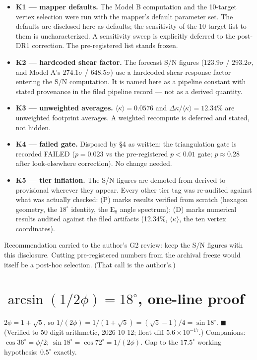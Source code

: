 \documentclass{alienfolio}
\begin{document}
\begin{itemize}
\item \textbf{K1 --- mapper defaults.} The Model B computation and the
10-target vertex selection were run with the mapper's default parameter
set. The defaults are disclosed here as defaults; the sensitivity of the
10-target list to them is uncharacterized. A sensitivity sweep is
explicitly deferred to the post-DR1 correction. The pre-registered list
stands frozen.
\item \textbf{K2 --- hardcoded shear factor.} The forecast S/N figures
($123.9\sigma$ / $293.2\sigma$, and Model A's $274.1\sigma$ /
$648.5\sigma$) use a hardcoded shear-response factor entering the S/N
computation. It is named here as a pipeline constant with stated
provenance in the filed pipeline record --- not as a derived quantity.
\item \textbf{K3 --- unweighted averages.} $\langle\kappa\rangle =
0.0576$ and $\Delta\kappa/\langle\kappa\rangle = 12.34\%$ are unweighted
footprint averages. A weighted recompute is deferred and stated, not
hidden.
\item \textbf{K4 --- failed gate.} Disposed by \S4 as written: the
triangulation gate is recorded FAILED ($p = 0.023$ vs the pre-registered
$p < 0.01$ gate; $p \approx 0.28$ after look-elsewhere correction). No
change needed.
\item \textbf{K5 --- tier inflation.} The S/N figures are demoted from derived to provisional wherever they appear. Every other tier tag
was re-audited against what was actually checked: (P) marks results verified from scratch (hexagon geometry, the $18^\circ$ identity, the
$\mathrm{E}_8$ angle spectrum); (D) marks numerical results audited against the filed artifacts (12.34\%, $\langle\kappa\rangle$, the ten vertex
coordinates).
\end{itemize}

Recommendation carried to the author's G2 review: keep the S/N figures
with this disclosure. Cutting pre-registered numbers from the archival
freeze would itself be a post-hoc selection. (That call is the author's.)

\appendix

\section{$\arcsin(1/2\phi) = 18^\circ$, one-line proof}
\label{app:proof}

$2\phi = 1 + \sqrt{5}$, so $1/(2\phi) = 1/(1+\sqrt{5}) =
(\sqrt{5}-1)/4 = \sin 18^\circ$. $\blacksquare$ (Verified to 50-digit
arithmetic, 2026-10-12; float diff $5.6\times10^{-17}$.) Companions:
$\cos 36^\circ = \phi/2$; $\sin 18^\circ = \cos 72^\circ = 1/(2\phi)$.
Gap to the $17.5^\circ$ working hypothesis: $0.5^\circ$ exactly.
\end{document}
